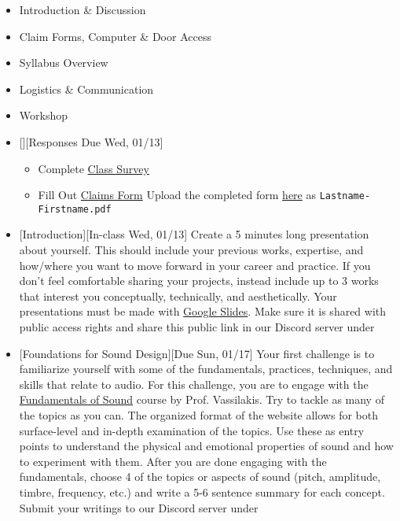 \def\dMon{Mon, 01/11}
\def\dTues{Tues, 01/12}
\def\dWed{Wed, 01/13}
\def\dThur{Thur, 01/14}
\def\dFri{Fri, 01/15}
\def\dSat{Sat, 01/16}
\def\dSun{Sun, 01/17}
\placeDate

\begin{itemize}[noitemsep,topsep=0pt,leftmargin=*]
      \item Introduction \& Discussion
      \item Claim Forms, Computer \& Door Access
      \item Syllabus Overview
      \item Logistics \& Communication
      \item Workshop
\end{itemize}
\vspace{1em}

\begin{itemize}[noitemsep,topsep=0pt,leftmargin=*]
      \item {}[][Responses Due \dWed]
            \begin{itemize}
                  \item Complete \href{https://forms.gle/RnFhT6QbLLC9UYqm7}{Class Survey}
                  \item Fill Out \href{https://drive.google.com/file/d/1SeksTmFmQa6uehrmoSIL_uO8tuORo0P3/view}{Claims Form}
                        \newline Upload the completed form \href{https://osu.app.box.com/f/21e679a1efd4425b869edf8df0c4c77a}{here} as \texttt{Lastname-Firstname.pdf}
            \end{itemize}
      \item {}[Introduction][In-class \dWed] \newline Create a 5 minutes long presentation about yourself. This should include your previous works, expertise, and how/where you want to move forward in your career and practice. If you don't feel comfortable sharing your projects, instead include up to 3 works that interest you conceptually, technically, and aesthetically. Your presentations must be made with \href{https://docs.google.com/presentation/}{Google Slides}. Make sure it is shared with public access rights and share this public link in our Discord server under 
      \item {}[Foundations for Sound Design][Due \dSun]
            \newline Your first challenge is to familiarize yourself with some of the fundamentals, practices, techniques, and skills that relate to audio. For this challenge, you are to engage with the \href{http://www.acousticslab.org/RECA220/}{Fundamentals of Sound} course by Prof. Vassilakis. Try to tackle as many of the topics as you can. The organized format of the website allows for both surface-level and in-depth examination of the topics. Use these as entry points to understand the physical and emotional properties of sound and how to experiment with them. After you are done engaging with the fundamentals, choose 4 of the topics or aspects of sound (pitch, amplitude, timbre, frequency, etc.) and write a 5-6 sentence summary for each concept. Submit your writings to our Discord server under \discordC

\end{itemize}

